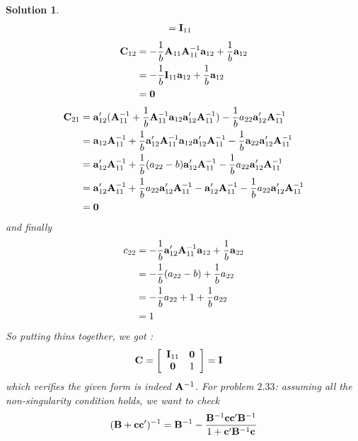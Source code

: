 \documentclass[11pt]{article}\usepackage[]{graphicx}\usepackage[]{color}
\newtheorem{sol}{Solution}
\begin{document}
\begin{sol}
\begin{align*}
		&= {\bf I}_{11}
	\end{align*}
	\begin{align*}
		{\bf C}_{12} &= -\frac{1}{b}{\bf A}_{11}{\bf A}_{11}^{-1}{\bf a}_{12} +\frac{1}{b}{\bf a}_{12}\\
		&= -\frac{1}{b}{\bf I}_{11}{\bf a}_{12} + \frac{1}{b}{\bf a}_{12}\\
		&= {\bf 0}
	\end{align*}
	\begin{align*}
		{\bf C}_{21} &= {\bf a}'_{12}({\bf A}_{11}^{-1} + \frac{1}{b}{\bf A}_{11}^{-1}{\bf a}_{12}{\bf a}'_{12}{\bf A}_{11}^{-1}) - \frac{1}{b}a_{22}{\bf a}'_{12}{\bf A}_{11}^{-1}\\
		&= {\bf a}_{12}{\bf A}_{11}^{-1} + \frac{1}{b}{\bf a}_{12}'{\bf A}_{11}^{-1}{\bf a}_{12}{\bf a}_{12}'{\bf A}_{11}^{-1} - \frac{1}{b}{\bf a}_{22}{\bf a}_{12}'{\bf A}_{11}^{-1}\\
		&= {\bf a}'_{12}{\bf A}_{11}^{-1} + \frac{1}{b}(a_{22} - b){\bf a}_{12}'{\bf A}_{11}^{-1} - \frac{1}{b}a_{22}{\bf a}_{12}'{\bf A}_{11}^{-1}\\
		&= {\bf a}_{12}'{\bf A}_{11}^{-1} +\frac{1}{b}a_{22}{\bf a}_{12}'{\bf A}_{11}^{-1} - {\bf a}_{12}'{\bf A}_{11}^{-1} - \frac{1}{b}a_{22}{\bf a}_{12}'{\bf A}_{11}^{-1}\\
		&= {\bf 0}
	\end{align*}
	and finally
	\begin{align*}
		c_{22}  &= -\frac{1}{b}{\bf a}'_{12}{\bf A}_{11}^{-1}{\bf a}_{12} + \frac{1}{b}{\bf a}_{22}\\
		&= -\frac{1}{b}(a_{22} - b) + \frac{1}{b}a_{22}\\
		&= -\frac{1}{b}a_{22} +1+ \frac{1}{b}a_{22}\\
		&= 1
	\end{align*}
	So putting thins together, we got :
	\begin{align*}
		{\bf C} &= \left[\begin{array}{cc} {\bf I}_{11}& {\bf 0}\\ {\bf 0}& 1\end{array}\right] = {\bf I}
	\end{align*}
	which verifies the given form is indeed ${\bf A}^{-1}$.\vskip 2mm
	For problem $2.33$:\vskip 2mm
	assuming all the non-singularity condition holds, we want to check
	\begin{align*}
		({\bf B} + {\bf c}{\bf c}')^{-1} = {\bf B}^{-1} - \frac{{\bf B}^{-1}{\bf c}{\bf c}'{\bf B}^{-1}}{1 + {\bf c}'{\bf B}^{-1}{\bf c}}
	\end{align*}

\end{sol}
\end{document}
